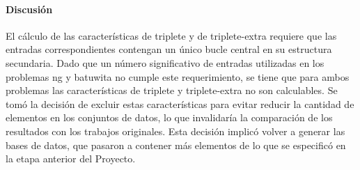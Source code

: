 \documentclass[12pt,bibliography=oldstyle,DIV=12,parskip=half-]{scrreprt}
\begin{document}
\paragraph{Discusión}
El cálculo de las características de triplete y de triplete-extra
requiere que las entradas correspondientes contengan un único bucle
central en su estructura secundaria. Dado que un número significativo
de entradas utilizadas en los problemas {ng} y {batuwita} no
cumple este requerimiento, se tiene que para ambos problemas las
características de triplete y triplete-extra no son calculables.
Se tomó la decisión de excluir estas características para
evitar reducir la cantidad de elementos en los conjuntos de datos, lo
que invalidaría la comparación de los resultados con los trabajos
originales. Esta decisión implicó volver a generar las bases de datos,
que pasaron a contener más elementos de lo que se especificó en la
etapa anterior del Proyecto.
\end{document}
